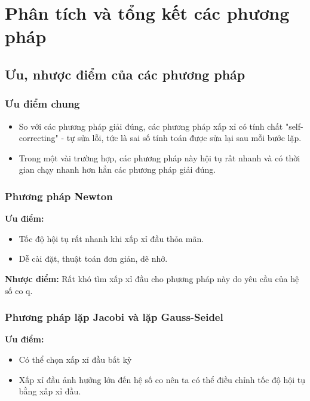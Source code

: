 \section{Phân tích và tổng kết các phương pháp}
\subsection{Ưu, nhược điểm của các phương pháp}
    
    \subsubsection{Ưu điểm chung}
        \begin{itemize}
            \item So với các phương pháp giải đúng, các phương pháp xấp xỉ có tính chất "self-correcting"\cite{nummethodMATLAB} - tự sửa lỗi, tức là sai số tính toán được sửa lại sau mỗi bước lặp.
            
            \item Trong một vài trường hợp, các phương pháp này hội tụ rất nhanh và có thời gian chạy nhanh hơn hẳn các phương pháp giải đúng.
        \end{itemize}

    \subsubsection{Phương pháp Newton}
        \par \textbf{Ưu điểm:}
        \begin{itemize}
            \item Tốc độ hội tụ rất nhanh khi xấp xỉ đầu thỏa mãn.
            \item Dễ cài đặt, thuật toán đơn giản, dẽ nhớ.
        \end{itemize}

        \par \textbf{Nhược điểm:} Rất khó tìm xấp xỉ đầu cho phương pháp này do yêu cầu của hệ số co q.

    \subsubsection{Phương pháp lặp Jacobi và lặp Gauss-Seidel}
        \par \textbf{Ưu điểm:}
        \begin{itemize}
            \item Có thể chọn xấp xỉ đầu bất kỳ
            \item Xấp xỉ đầu ảnh hưởng lớn đến hệ số co nên ta có thể điều chỉnh tốc độ hội tụ bằng xấp xỉ đầu.
        \end{itemize}
        
